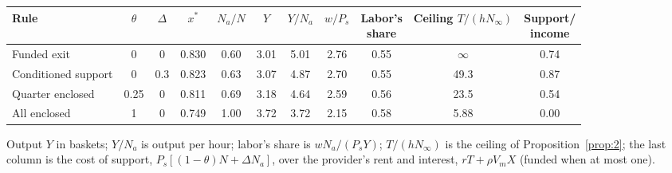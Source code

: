 {\footnotesize\setlength{\tabcolsep}{4.5pt}
\begin{tabular}{l c c c c c c c c c c}
\toprule
Rule & $\theta$ & $\Delta$ & $x^*$ & $N_a/N$ & $Y$ & $Y/N_a$ & $w/P_s$ & \shortstack{Labor's\\share} & \shortstack{Ceiling\\$T/(hN_\infty)$} & \shortstack{Support/\\income} \\
\midrule
Funded exit & 0 & 0 & 0.830 & 0.60 & 3.01 & 5.01 & 2.76 & 0.55 & $\infty$ & 0.74 \\
Conditioned support & 0 & 0.3 & 0.823 & 0.63 & 3.07 & 4.87 & 2.70 & 0.55 & 49.3 & 0.87 \\
Quarter enclosed & 0.25 & 0 & 0.811 & 0.69 & 3.18 & 4.64 & 2.59 & 0.56 & 23.5 & 0.54 \\
All enclosed & 1 & 0 & 0.749 & 1.00 & 3.72 & 3.72 & 2.15 & 0.58 & 5.88 & 0.00 \\
\bottomrule
\end{tabular}
\par\smallskip\parbox{0.95\linewidth}{\footnotesize Output $Y$ in baskets; $Y/N_a$ is output per hour; labor's share is $wN_a/(P_sY)$; $T/(hN_\infty)$ is the ceiling of Proposition~\ref{prop:2}; the last column is the cost of support, $P_s[(1-\theta)N+\Delta N_a]$, over the provider's rent and interest, $rT+\rho V_mX$ (funded when at most one).}
}
